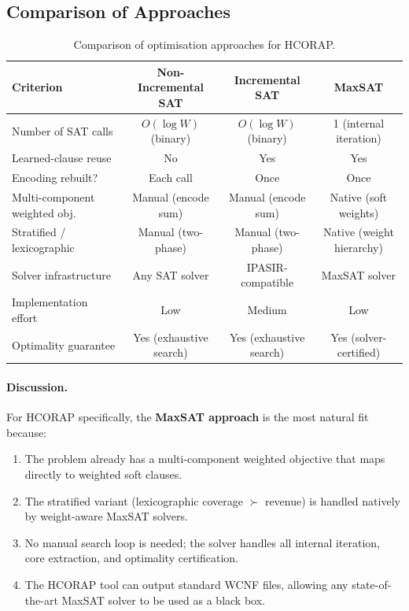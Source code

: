 \documentclass[11pt,a4paper]{article}
\begin{document}
\subsection{Comparison of Approaches}\label{sec:opt-comparison}

\begin{table}[ht]
\centering
\caption{Comparison of optimisation approaches for HCORAP.}
\label{tab:opt-comparison}
\small
\begin{tabular}{@{}lccc@{}}
\toprule
\textbf{Criterion}
    & \textbf{Non-Incremental SAT}
    & \textbf{Incremental SAT}
    & \textbf{MaxSAT} \\
\midrule
Number of SAT calls
    & $O(\log W)$ (binary)
    & $O(\log W)$ (binary)
    & 1 (internal iteration) \\[3pt]
Learned-clause reuse
    & \textsf{No}
    & \textsf{Yes}
    & \textsf{Yes} \\[3pt]
Encoding rebuilt?
    & Each call
    & Once
    & Once \\[3pt]
Multi-component weighted obj.
    & Manual (encode sum)
    & Manual (encode sum)
    & Native (soft weights) \\[3pt]
Stratified / lexicographic
    & Manual (two-phase)
    & Manual (two-phase)
    & Native (weight hierarchy) \\[3pt]
Solver infrastructure
    & Any SAT solver
    & IPASIR-compatible
    & MaxSAT solver \\[3pt]
Implementation effort
    & Low
    & Medium
    & Low \\[3pt]
Optimality guarantee
    & Yes (exhaustive search)
    & Yes (exhaustive search)
    & Yes (solver-certified) \\
\bottomrule
\end{tabular}
\end{table}

\paragraph{Discussion.}
For HCORAP specifically, the \textbf{MaxSAT approach} is the most natural fit
because:
\begin{enumerate}[label=(\alph*)]
    \item The problem already has a multi-component weighted objective that maps
          directly to weighted soft clauses.
    \item The stratified variant (lexicographic coverage $\succ$ revenue) is
          handled natively by weight-aware MaxSAT solvers.
    \item No manual search loop is needed; the solver handles all internal
          iteration, core extraction, and optimality certification.
    \item The HCORAP tool can output standard WCNF files, allowing any
          state-of-the-art MaxSAT solver to be used as a black box.
\end{enumerate}
\end{document}
